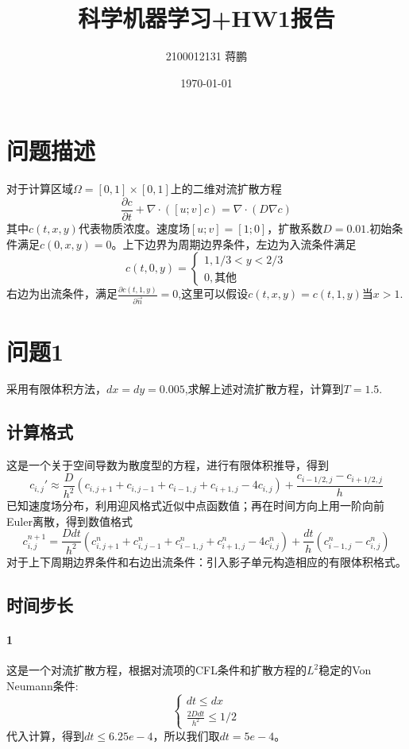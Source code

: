 \documentclass[11pt,a4 paper,one side]{article}
\title{科学机器学习+HW1报告}
\author{2100012131 蒋鹏}
\date{\today}
\begin{document}
\maketitle
\tableofcontents
\section{问题描述}
对于计算区域$\Omega=[0,1]\times [0,1]$上的二维对流扩散方程\begin{equation}
    \frac{\partial c}{\partial t}+\nabla \cdot ([u;v]c) = \nabla \cdot(D\nabla c)
\end{equation}
其中$c(t,x,y)$代表物质浓度。速度场$[u;v]=[1;0]$，扩散系数$D=0.01$.初始条件满足$c(0,x,y)=0$。上下边界为周期边界条件，左边为入流条件满足\begin{equation}
    c(t,0,y)=\begin{cases}
        1,1/3<y<2/3 \\ 0,\text{其他}
    \end{cases}
\end{equation}
右边为出流条件，满足$\frac{\partial c(t,1,y)}{\partial \vec{n}}=0$,这里可以假设$c(t,x,y)=c(t,1,y)$当$x>1$.
\section{问题1}
采用有限体积方法，$dx=dy=0.005$,求解上述对流扩散方程，计算到$T=1.5$.
\subsection{计算格式}
这是一个关于空间导数为散度型的方程，进行有限体积推导，得到\begin{equation}
    c_{i,j}'\approx \frac{D}{h^2}(c_{i,j+1}+c_{i,j-1}+c_{i-1,j}+c_{i+1,j}-4c_{i,j})+\frac{c_{i-1/2,j}-c_{i+1/2,j}}{h}
\end{equation}
已知速度场分布，利用迎风格式近似中点函数值；再在时间方向上用一阶向前Euler离散，得到数值格式\begin{equation}
    c_{i,j}^{n+1} = \frac{Ddt}{h^2}(c_{i,j+1}^n+c_{i,j-1}^n+c_{i-1,j}^n+c_{i+1,j}^n-4c_{i,j}^n)+\frac{dt}{h}(c_{i-1,j}^n-c_{i,j}^n)
\end{equation}
对于上下周期边界条件和右边出流条件：引入影子单元构造相应的有限体积格式。
\subsection{时间步长}
\paragraph{1}这是一个对流扩散方程，根据对流项的CFL条件和扩散方程的$L^2$稳定的Von Neumann条件:\begin{equation}
    \begin{cases}
        dt \leq dx \\ \frac{2Ddt}{h^2}\leq 1/2
    \end{cases}
\end{equation}
代入计算，得到$dt\leq 6.25e-4$，所以我们取$dt=5e-4$。
\end{document}
